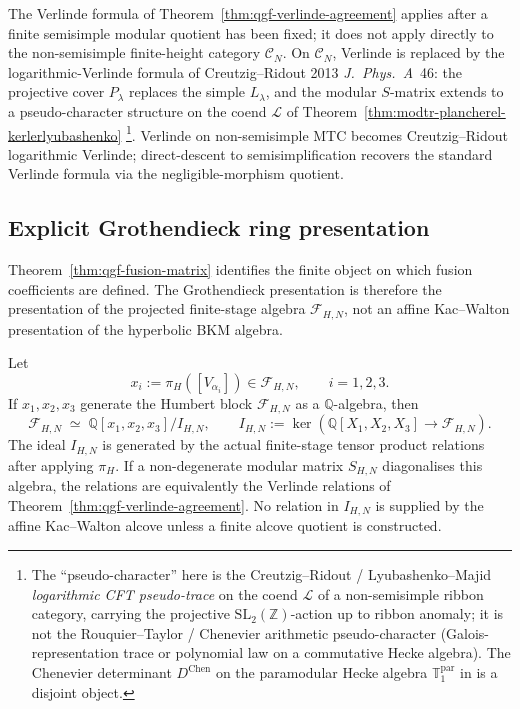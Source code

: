 \begin{remark}
\label{rem:qgf-verlinde-discipline}
The Verlinde formula of Theorem~\ref{thm:qgf-verlinde-agreement}
applies after a finite semisimple modular quotient has been fixed; it
does not apply directly to the non-semisimple finite-height category
\(\mathcal C_N\). On \(\mathcal C_N\), Verlinde is replaced by the logarithmic-Verlinde
formula of Creutzig--Ridout 2013 \emph{J.~Phys.\ A}~46: the projective
cover $P_\lambda$ replaces the simple $L_\lambda$, and the modular
$S$-matrix extends to a
pseudo-character structure on the coend $\mathcal L$ of
Theorem~\ref{thm:modtr-plancherel-kerlerlyubashenko}%
\footnote{The ``pseudo-character'' here is the Creutzig--Ridout /
Lyubashenko--Majid \emph{logarithmic CFT pseudo-trace} on the coend
$\mathcal L$ of a non-semisimple ribbon category, carrying the
projective $\mathrm{SL}_2(\mathbb Z)$-action up to ribbon anomaly;
it is not the Rouquier--Taylor / Chenevier arithmetic
pseudo-character (Galois-representation trace or polynomial law on
a commutative Hecke algebra). The Chenevier determinant
$D^{\mathrm{Chen}}$ on the paramodular Hecke algebra $\mathbb{T}^{\mathrm{par}}_1$ in
\cite{VolI} is a disjoint
object.}. Verlinde on non-semisimple MTC becomes Creutzig--Ridout
logarithmic Verlinde; direct-descent to semisimplification recovers
the standard Verlinde formula via the negligible-morphism quotient.
\end{remark}

\subsection{Explicit Grothendieck ring presentation}
\label{subsec:qgf-grothendieck-presentation}

Theorem~\ref{thm:qgf-fusion-matrix} identifies the finite object on
which fusion coefficients are defined. The Grothendieck presentation is
therefore the presentation of the projected finite-stage algebra
\(\mathcal F_{H,N}\), not an affine Kac--Walton presentation of the
hyperbolic BKM algebra.

\begin{theorem}
\label{thm:qgf-grothendieck-presentation}
Let
\[
 x_i:=\pi_H([V_{\alpha_i}])\in\mathcal F_{H,N},\qquad i=1,2,3.
\]
If \(x_1,x_2,x_3\) generate the Humbert block
\(\mathcal F_{H,N}\) as a \(\mathbb Q\)-algebra, then
\[
 \boxed{\;
 \mathcal F_{H,N}
 \;\simeq\;
 \mathbb Q[x_1,x_2,x_3]/I_{H,N},
 \qquad
 I_{H,N}:=\ker\!\left(\mathbb Q[X_1,X_2,X_3]\to\mathcal F_{H,N}\right).
 \;}
\]
The ideal \(I_{H,N}\) is generated by the actual finite-stage tensor
product relations after applying \(\pi_H\). If a non-degenerate modular
matrix \(S_{H,N}\) diagonalises this algebra, the relations are
equivalently the Verlinde relations of
Theorem~\ref{thm:qgf-verlinde-agreement}. No relation in \(I_{H,N}\)
is supplied by the affine Kac--Walton alcove unless a finite alcove
quotient is constructed.
\end{theorem}

